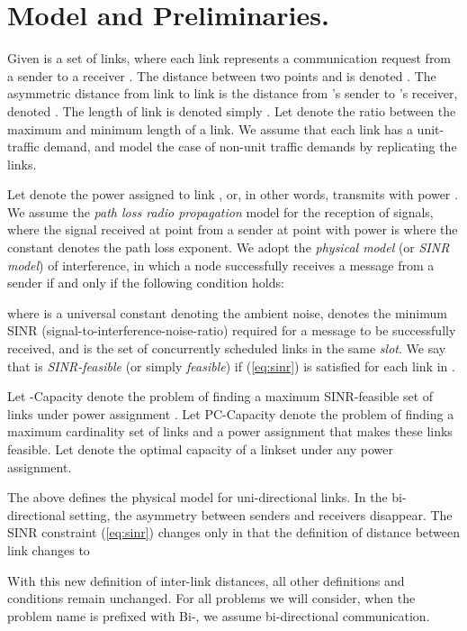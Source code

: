 \documentclass[11pt]{amsart}
\newcommand{\prob}[1]{\textsf{#1}}  \newcommand{\myparagraph}[1]{\smallskip\noindent\textbf{#1}\quad}
\begin{document}
\section{Model and Preliminaries.}
\label{sec:model}

Given is a set  of links, where
each link  represents a communication request from a sender
 to a receiver . 
The distance between two points  and  is denoted .
The asymmetric distance from link  to link  is the distance from
's sender to 's receiver, denoted .
The length of link  is denoted 
simply .
Let  denote the ratio between the maximum and minimum length of a link.
We assume that each link has a unit-traffic demand, and model the case
of non-unit traffic demands by replicating the links.

Let  denote the power assigned to link , or, in other words,  transmits with power . 
We assume the \emph{path loss radio propagation} model for the
reception of signals, where the signal received at point
 from a sender at point  with power   is  where the constant 
 denotes the
path loss exponent. 
We adopt the \emph{physical model} (or \emph{SINR model})
of interference, in which a node 
successfully receives a message from a sender  if and only if the
following condition holds:

where  is a universal constant denoting the ambient noise,  denotes the minimum
SINR (signal-to-interference-noise-ratio) required for a message to be successfully received,
and  is the set of concurrently scheduled links in the same \emph{slot}.
We say that  is \emph{SINR-feasible} (or simply \emph{feasible}) if (\ref{eq:sinr}) is
satisfied for each link in . 


Let \prob{-Capacity} denote the
problem of finding a maximum SINR-feasible set of links under power
assignment .
Let \prob{PC-Capacity} denote the problem of finding a maximum
cardinality set of links and a power assignment that makes these links feasible.
Let  denote the optimal capacity of a linkset  under
any power assignment. 

The above defines the physical model for uni-directional links.
In the bi-directional setting, 
the asymmetry between senders and receivers disappear.
The SINR constraint (\ref{eq:sinr}) changes only in that the definition
of distance between link changes to 

With this new definition of inter-link distances, all other definitions and conditions remain unchanged.
For all problems we will consider, when the problem name is prefixed 
with \prob{Bi-}, we assume bi-directional communication.
\end{document}
